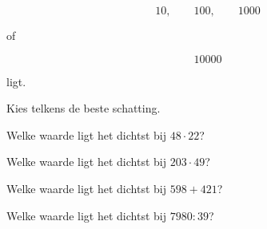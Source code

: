 \documentclass{ximera}
\begin{document}
\[
10,\qquad100,\qquad1000
\]

of

\[
10000
\]

ligt.


\begin{oefening}{\oefB}

Kies telkens de beste schatting.

\begin{question}

Welke waarde ligt het dichtst bij \(48\cdot22\)?

\begin{multipleChoice}
\end{multipleChoice}

\end{question}


\begin{question}

Welke waarde ligt het dichtst bij \(203\cdot49\)?

\begin{multipleChoice}
\end{multipleChoice}

\end{question}


\begin{question}

Welke waarde ligt het dichtst bij \(598+421\)?

\begin{multipleChoice}
\end{multipleChoice}

\end{question}


\begin{question}

Welke waarde ligt het dichtst bij \(7980:39\)?

\begin{multipleChoice}
\end{multipleChoice}

\end{question}

\end{oefening}
\end{document}
